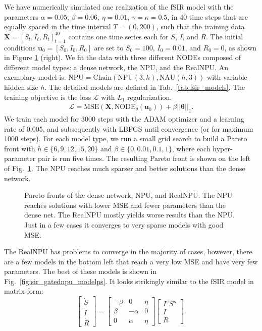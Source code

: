 \documentclass[9pt]{article}
\newcommand{\npu}{\text{NPU}}
\newcommand{\nau}{\text{NAU}}
\newcommand{\chain}{\text{Chain}}
\renewcommand{\arraystretch}{1.2}
\begin{document}
We have numerically simulated one realization of the fSIR model with the
parameters $\alpha=0.05$, $\beta=0.06$, $\eta=0.01$, $\gamma=\kappa=0.5$, in 40
time steps that are equally spaced in the time interval $T=(0,200)$, such that
the training data $\bm X = [S_t,I_t,R_t]_{t=1}^{40}$
contains one time series each for $S$, $I$, and $R$.  The initial conditions
$\bm u_0=[S_0,I_0,R_0]$ are set to $S_0=100$, $I_0=0.01$, and $R_0=0$, as shown in Figure
\ref{fig:pareto_sir} (right).
We fit the data with three
different NODEs composed of different model types: a dense network, the NPU, and
the RealNPU. An exemplary model is: $\npu=\chain(\npu(3,h),\nau(h,3))$ with
variable hidden size $h$.  The detailed models are defined in
Tab.~\ref{tab:fsir_models}. The training objective is the loss $\mathcal{L}$
with $L_1$ regularization.
\begin{align}
  \label{eq:sir_loss}
  \mathcal{L} = \text{MSE}(\bm X,\text{NODE}_\theta(\bm u_0)) + \beta||\bm\theta||_1.
\end{align}
We train each model for 3000 steps with the ADAM optimizer and a learning rate
of 0.005, and subsequently with LBFGS until convergence (or for maximum 1000
steps).  For each model type, we run a small grid search to build a Pareto front
with $h\in \{6,9,12,15,20\}$ and $\beta\in\{0,0.01,0.1,1\}$, where each
hyper-parameter pair is run five times. The resulting Pareto front is shown on
the left of Fig.~\ref{fig:pareto_sir}. The NPU reaches much sparser and
better solutions than the dense network.
\begin{figure}
  \centering
  \resizebox{.9\textwidth}{!}{}
  \caption{Pareto fronts of the dense network, NPU, and RealNPU. The
  NPU reaches solutions with lower MSE and fewer parameters than the dense
  net. The RealNPU mostly yields worse results than the NPU. Just in a few
  cases it converges to very sparse models with good MSE.}%
  \label{fig:pareto_sir}
\end{figure}
The RealNPU has problems to converge in the majority of cases, however, 
there are a few models in the bottom left that
reach a very low MSE and have very few parameters. The best of these models is
shown in Fig.~\ref{fig:sir_gatednpu_modelps}.  It looks strikingly similar to
the fSIR model in matrix form:
\renewcommand*{\arraystretch}{1.3}
\begin{equation}
  \begin{bmatrix}
    \dot S \\ \dot I \\ \dot R
  \end{bmatrix}
  =
  \begin{bmatrix}
    -\beta & 0 & \eta \\
    \beta & -\alpha & 0 \\
    0 & \alpha & \eta
  \end{bmatrix}
  \begin{bmatrix}
    I^\gamma S^\kappa \\ I \\ R
  \end{bmatrix}.
\end{equation}
\end{document}
